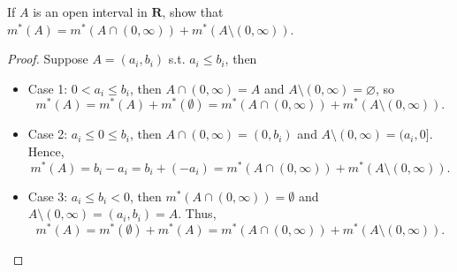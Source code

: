 \begin{problem}[Exercises 7.4.1.]
    If $A$ is an open interval in $\mathbf{R}$, show that $m^*(A)=m^*(A\cap(0,\infty))+m^*(A\setminus(0,\infty))$.
\end{problem}
\begin{proof}
Suppose \(A = (a_i, b_i)\) s.t. \(a_i \le b_i\), then 
        \begin{itemize}
            \item Case 1: \(0 < a_i \le b_i\), then \(A \cap (0, \infty ) = A\) and \(A \setminus (0, \infty ) = \varnothing\), so
            \[
                m^*(A) = m^*(A) + m^*(\emptyset) = m^*(A \cap (0, \infty)) + m^*(A \setminus (0, \infty)).
            \]
            \item Case 2: \(a_i \le 0 \le b_i\), then $A \cap (0, \infty) = (0, b_i)$ and $A \setminus (0, \infty) = (a_i, 0]$. Hence,
            \[
            m^*(A) = b_i - a_i = b_i + (-a_i) = m^*(A \cap (0, \infty)) + m^*(A \setminus (0, \infty)).
            \]
            \item Case 3: \(a_i \le b_i < 0\), then $m^*(A \cap (0, \infty)) = \emptyset$ and $A \setminus (0, \infty) = (a_i, b_i) = A$. Thus,
            \[
                m^*(A) = m^*(\emptyset) + m^*(A) = m^*(A \cap (0, \infty)) + m^*(A \setminus (0, \infty)).
            \]
        \end{itemize}
\end{proof}

